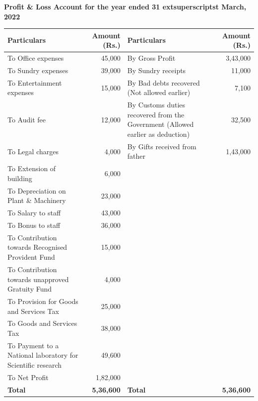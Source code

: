 \documentclass[11pt,a4paper]{article}
\begin{document}
\begin{center}
   \textbf{Profit \& Loss Account for the year ended 31 extsuperscript{st} March, 2022} \\[6pt]
  
\begin{tabular}{|p{4.3cm}|r|p{4.3cm}|r|}
    \hline
   \textbf{Particulars} &   \textbf{Amount (Rs.)} &   \textbf{Particulars} &   \textbf{Amount (Rs.)} \\ \hline
    \raggedright To Office expenses & 45,000 & \raggedright By Gross Profit & 3,43,000 \\
    \raggedright To Sundry expenses & 39,000 & \raggedright By Sundry receipts & 11,000 \\
    \raggedright To Entertainment expenses & 15,000 & \raggedright By Bad debts recovered (Not allowed earlier) & 7,100 \\
    \raggedright To Audit fee & 12,000 & \raggedright By Customs duties recovered from the Government (Allowed earlier as deduction) & 32,500 \\
    \raggedright To Legal charges & 4,000 & \raggedright By Gifts received from father & 1,43,000 \\
    \raggedright To Extension of building & 6,000 & & \\
    \raggedright To Depreciation on Plant \& Machinery & 23,000 & & \\
    \raggedright To Salary to staff & 43,000 & & \\
    \raggedright To Bonus to staff & 36,000 & & \\
    \raggedright To Contribution towards Recognised Provident Fund & 15,000 & & \\
    \raggedright To Contribution towards unapproved Gratuity Fund & 4,000 & & \\
    \raggedright To Provision for Goods and Services Tax & 25,000 & & \\
    \raggedright To Goods and Services Tax & 38,000 & & \\
    \raggedright To Payment to a National laboratory for Scientific research & 49,600 & & \\
    \raggedright To Net Profit & 1,82,000 & & \\ \hline
   \textbf{Total} &   \textbf{5,36,600} &   \textbf{Total} &   \textbf{5,36,600} \\ \hline
  \end{tabular}
\end{center}
\end{document}
